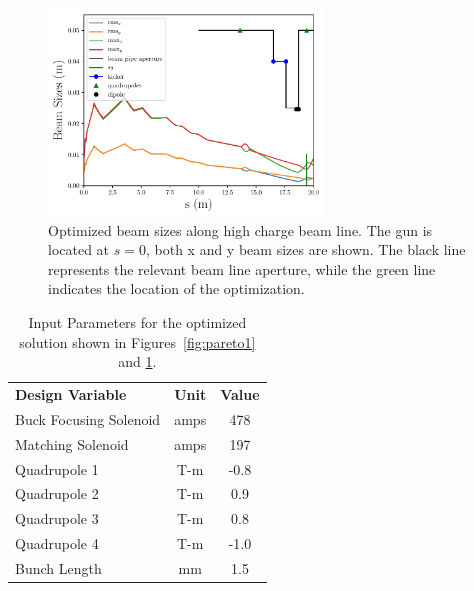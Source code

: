 \begin{figure}
	\includegraphics[width=0.65\textwidth]{xy-max-min-sigma-paper}
	\caption{Optimized beam sizes along high charge beam line. The gun is located at $s=0$, 
	both x and y beam sizes are shown. The black line represents the relevant beam line aperture, while
	the green line indicates the location of the optimization.}
	\label{fig:stat}
\end{figure}
\begin{table}%
	\begin{center}
		\caption{Input Parameters for the optimized solution shown in Figures~\ref{fig:pareto1} and \ref{fig:stat}.}
		\label{tab:designopt}  
		\vspace{1em} 
		\begin{tabular}{l|c|c}
			\cline{1-3}
			\textbf{Design Variable} \qquad \qquad & \textbf{Unit}	\quad&  \textbf{Value}  \\ 
			\cline{1-3}
			{Buck Focusing Solenoid} \qquad \qquad & amps	\quad & 478 \\
			Matching Solenoid &	amps	& 197	  \\
			Quadrupole 1& T-m		& -0.8	\\ 
			Quadrupole 2& T-m		& 0.9	\\
			Quadrupole 3 & T-m		& 0.8	\\
			Quadrupole 4 & T-m		& -1.0	\\ 
			Bunch Length & mm 		& 1.5	\\
			\cline{1-3}
		\end{tabular}
	\end{center}
\end{table}








